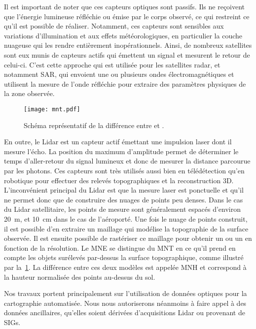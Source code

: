 Il est important de noter que ces capteurs optiques sont passifs. Ils ne reçoivent que l'énergie lumineuse réfléchie ou émise par le corps observé, ce qui restreint ce qu'il est possible de réaliser. Notamment, ces capteurs sont sensibles aux variations d'illumination et aux effets météorologiques, en particulier la couche nuageuse qui les rendre entièrement inopérationnels. Ainsi, de nombreux satellites sont eux munis de capteurs actifs qui émettent un signal et mesurent le retour de celui-ci. C'est cette approche qui est utilisée pour les satellites radar, et notamment \gls{SAR}, qui envoient une ou plusieurs ondes électromagnétiques et utilisent la mesure de l'onde réfléchie pour extraire des paramètres physiques de la zone observée.

\begin{figure}
  \texttt{[image: mnt.pdf]}
  \caption{Schéma représentatif de la différence entre  et .}
  \label{fig:mnt}
\end{figure}

En outre, le \gls{Lidar} est un capteur actif émettant une impulsion laser dont il mesure l'écho. La position du maximum d'amplitude permet de déterminer le temps d'aller-retour du signal lumineux et donc de mesurer la distance parcourue par les photons. Ces capteurs sont très utilisés aussi bien en télédétection qu'en robotique pour effectuer des relevés topographiques et la reconstruction 3D. L'inconvénient principal du \gls{Lidar} est que la mesure laser est ponctuelle et qu'il ne permet donc que de construire des nuages de points peu denses. Dans le cas du \gls{Lidar} satellitaire, les points de mesure sont généralement espacés d'environ \SI{20}{\meter}, et \SI{10}{\centi\meter} dans le cas de l'aéroporté. Une fois le nuage de points construit, il est possible d'en extraire un maillage qui modélise la topographie de la surface observée. Il est ensuite possible de rastériser ce maillage pour obtenir un  ou un  en fonction de la résolution. Le \gls{MNE} se distingue du \gls{MNT} en ce qu'il prend en compte les objets surélevés par-dessus la surface topographique, comme illustré par la~\cref{fig:mnt}. La différence entre ces deux modèles est appelée \gls{MNH} et correspond à la hauteur normalisée des points au-dessus du sol.

Nos travaux portent principalement sur l'utilisation de données optiques pour la cartographie automatisée. Nous nous autoriserons néanmoins à faire appel à des données ancillaires, qu'elles soient dérivées d'acquisitions \gls{Lidar} ou provenant de \glspl{SIG}.

